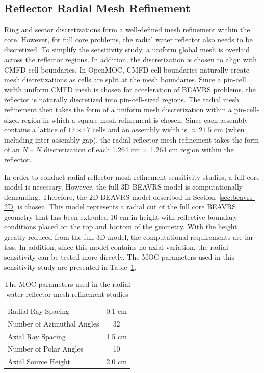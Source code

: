 \clearpage
\subsection{Reflector Radial Mesh Refinement}

Ring and sector discretizations form a well-defined mesh refinement within the core. However, for full core problems, the radial water reflector also needs to be discretized. To simplify the sensitivity study, a uniform global mesh is overlaid across the reflector regions. In addition, the discretization is chosen to align with \ac{CMFD} cell boundaries. In OpenMOC, \ac{CMFD} cell boundaries naturally create mesh discretizations as cells are split at the mesh boundaries. Since a pin-cell width uniform \ac{CMFD} mesh is chosen for acceleration of BEAVRS problems, the reflector is naturally discretized into pin-cell-sized regions. The radial mesh refinement then takes the form of a uniform mesh discretization within a pin-cell-sized region in which a square mesh refinement is chosen. Since each assembly contains a lattice of $17\times 17$ cells and an assembly width is $\approx 21.5$ cm (when including inter-assembly gap), the radial reflector mesh refinement takes the form of an $N \times N$ discretization of each 1.264 cm $\times$ 1.264 cm region within the reflector.

In order to conduct radial reflector mesh refinement sensitivity studies, a full core model is necessary. However, the full 3D BEAVRS model is computationally demanding. Therefore, the 2D BEAVRS model described in Section~\ref{sec:beavrs-2D} is chosen. This model represents a radial cut of the full core BEAVRS geometry that has been extruded 10 cm in height with reflective boundary conditions placed on the top and bottom of the geometry. With the height greatly reduced from the full 3D model, the computational requirements are far less. In addition, since this model contains no axial variation, the radial sensitivity can be tested more directly. The \ac{MOC} parameters used in this sensitivity study are presented in Table~\ref{tab:rad-ref-refinement-params}.


\begin{table}[ht]
	\centering
	\caption{The MOC parameters used in the radial water reflector mesh refinement studies}
	\medskip
	\begin{tabular}{lc}
		\hline
		Radial Ray Spacing & 0.1 cm \\
		Number of Azimuthal Angles & 32 \\
		Axial Ray Spacing & 1.5 cm \\
		Number of Polar Angles & 10 \\
		Axial Source Height & 2.0 cm \\
		\hline
	\end{tabular}
	\label{tab:rad-ref-refinement-params}
\end{table}

